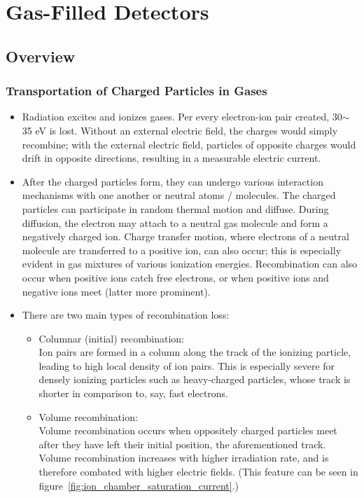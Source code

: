 \section{Gas-Filled Detectors} 
\subsection{Overview}
\subsubsection{Transportation of Charged Particles in Gases}
\begin{itemize}
    \item Radiation excites and ionizes gases. Per every electron-ion pair created, 30$\sim$35 eV is lost. Without an external electric field, the charges would simply recombine; with the external electric field, particles of opposite charges would drift in opposite directions, resulting in a measurable electric current. 
    \item After the charged particles form, they can undergo various interaction mechanisms with one another or neutral atoms / molecules. The charged particles can participate in random thermal motion and diffuse. During diffusion, the electron may attach to a neutral gas molecule and form a negatively charged ion. Charge transfer motion, where electrons of a neutral molecule are transferred to a positive ion, can also occur; this is especially evident in gas mixtures of various ionization energies. Recombination can also occur when positive ions catch free electrons, or when positive ions and negative ions meet (latter more prominent). 
    \item There are two main types of recombination loss:
    \begin{itemize}
        \item Columnar (initial) recombination:\\
        Ion pairs are formed in a column along the track of the ionizing particle, leading to high local density of ion pairs. This is especially severe for densely ionizing particles such as heavy-charged particles, whose track is shorter in comparison to, say, fast electrons. 
        \item Volume recombination:\\
        Volume recombination occurs when oppositely charged particles meet after they have left their initial position, the aforementioned track. Volume recombination increases with higher irradiation rate, and is therefore combated with higher electric fields. (This feature can be seen in figure~\ref{fig:ion_chamber_saturation_current}.)

\end{itemize}
\end{itemize}

